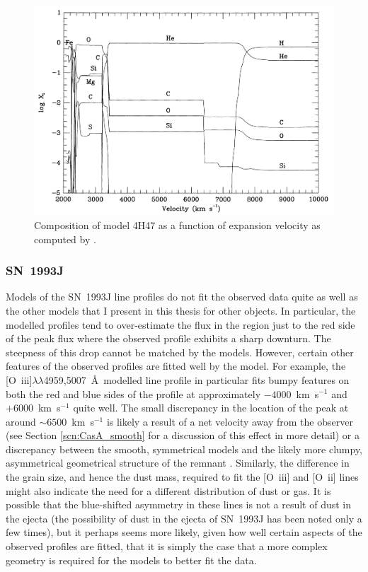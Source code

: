\begin{figure}
\centering
\includegraphics[scale=0.4,clip=true, trim=30 0 0 0]{chapters/chapter6/figs/93J/explosion_model.png}
\caption{Composition of model 4H47 as a function of expansion velocity as computed by \citet{Nomoto1993}.}
\label{4h47}
\end{figure}

\subsubsection{SN~1993J}

Models of the SN~1993J line profiles do not fit the observed data quite as well as the other models that I present in this thesis for other objects.  In particular, the modelled profiles tend to over-estimate the flux in the region just to the red side of the peak flux where the observed profile exhibits a sharp downturn.  The steepness of this drop cannot be matched by the models.  However, certain other features of the observed profiles are fitted well by the model.  For example, the [O~{\sc iii}]$\lambda\lambda$4959,5007~\AA\  modelled line profile in particular fits bumpy features on both the red and blue sides of the profile at approximately $-4000$~km~s$^{-1}$ and $+6000$~km~s$^{-1}$ quite well.  The small discrepancy in the location of the peak at around $\sim6500$~km~s$^{-1}$ is likely a result of a net velocity away from the observer (see Section \ref{scn:CasA_smooth} for a discussion of this effect in more detail) or a discrepancy between the smooth, symmetrical models and the likely more clumpy, asymmetrical geometrical structure of the remnant \citep{Tran1997}.  Similarly, the difference in the grain size, and hence the dust mass, required to fit the [O~{\sc iii}] and [O~{\sc ii}] lines might also indicate the need for a different distribution of dust or gas.  It is possible that the blue-shifted asymmetry in these lines is not a result of dust in the ejecta (the possibility of dust in the ejecta of SN~1993J has been noted only a few times), but it perhaps seems more likely, given how well certain aspects of the observed profiles are fitted, that it is simply the case that a more complex geometry is required for the models to better fit the data.

